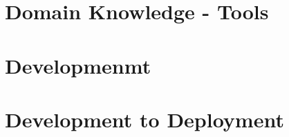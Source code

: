 \documentclass[10pt,a4paper,bibliography=totoc]{scrbook}
\begin{document}



\part{Domain Knowledge - Tools}  

  

  





\part{Developmenmt}

  

  

  

  

  


\part{Development to Deployment}

  

  



%  


\end{document}
